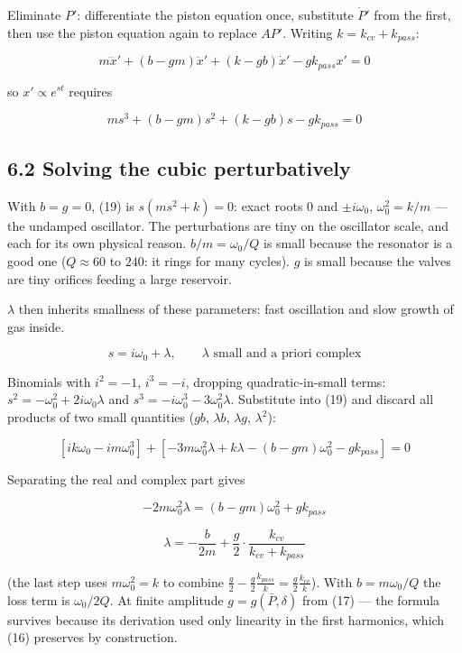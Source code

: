\documentclass[11pt]{article}
\begin{document}
Eliminate $P'$: differentiate the piston equation once, substitute $\dot P'$ from the first, then use the piston equation again to replace $AP'$. Writing $k = k_{cv}+k_{pass}$:

\[
m\dddot x' + (b - gm)\ddot x' + (k - gb)\dot x' - gk_{pass}x' = 0
\]

so $x' \propto e^{st}$ requires

\begin{equation}
ms^3 + (b - gm)s^2 + (k - gb)s - gk_{pass} = 0 \tag{19}
\end{equation}

\subsection*{6.2 Solving the cubic perturbatively}

With $b = g = 0$, (19) is $s(ms^2 + k) = 0$: exact roots $0$ and $\pm i\omega_0$, $\omega_0^2 = k/m$ --- the undamped oscillator. The perturbations are tiny on the oscillator scale, and each for its own physical reason. $b/m = \omega_0/Q$ is small because the resonator is a good one ($Q \approx 60$ to $240$: it rings for many cycles). $g$ is small because the valves are tiny orifices feeding a large reservoir.

 $\lambda$ then inherits smallness of these parameters: fast oscillation and slow growth of gas inside. 

\[
s = i\omega_0 + \lambda, \qquad \lambda \text{ small and a priori complex}
\]

Binomials with $i^2 = -1$, $i^3 = -i$, dropping quadratic-in-small terms: $s^2 = -\omega_0^2 + 2i\omega_0\lambda$ and $s^3 = -i\omega_0^3 - 3\omega_0^2\lambda$. Substitute into (19) and discard all products of two small quantities ($gb$, $\lambda b$, $\lambda g$, $\lambda^2$):

\[
\left[ik\omega_0 - im\omega_0^3\right] + \left[-3m\omega_0^2\lambda + k\lambda - (b - gm)\omega_0^2 - gk_{pass}\right] = 0
\]

Separating the real and complex part gives

\[
-2m\omega_0^2\lambda = (b - gm)\omega_0^2 + gk_{pass}
\]

\begin{equation}
\lambda = -\frac{b}{2m} + \frac{g}{2}\cdot\frac{k_{cv}}{k_{cv}+k_{pass}} \tag{20}
\end{equation}

(the last step uses $m\omega_0^2 = k$ to combine $\frac g2 - \frac g2\frac{k_{pass}}{k} = \frac g2\frac{k_{cv}}{k}$). With $b = m\omega_0/Q$ the loss term is $\omega_0/2Q$. At finite amplitude $g = g(\bar P, \delta)$ from (17) --- the formula survives because its derivation used only linearity in the first harmonics, which (16) preserves by construction.
\end{document}
